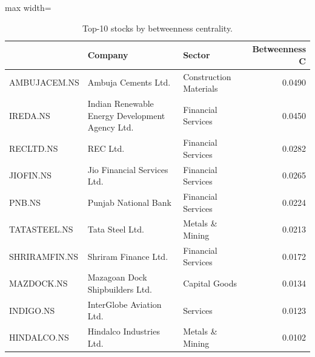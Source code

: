 \begin{table}
\centering
\caption{Top-10 stocks by betweenness centrality.}
\label{tab:top10_betweenness}
\begin{adjustbox}{max width=\textwidth}
\begin{tabular}{lllr}
\toprule
 & Company & Sector & Betweenness C \\
\midrule
AMBUJACEM.NS & Ambuja Cements Ltd. & Construction Materials & 0.0490 \\
IREDA.NS & Indian Renewable Energy Development Agency Ltd. & Financial Services & 0.0450 \\
RECLTD.NS & REC Ltd. & Financial Services & 0.0282 \\
JIOFIN.NS & Jio Financial Services Ltd. & Financial Services & 0.0265 \\
PNB.NS & Punjab National Bank & Financial Services & 0.0224 \\
TATASTEEL.NS & Tata Steel Ltd. & Metals \& Mining & 0.0213 \\
SHRIRAMFIN.NS & Shriram Finance Ltd. & Financial Services & 0.0172 \\
MAZDOCK.NS & Mazagoan Dock Shipbuilders Ltd. & Capital Goods & 0.0134 \\
INDIGO.NS & InterGlobe Aviation Ltd. & Services & 0.0123 \\
HINDALCO.NS & Hindalco Industries Ltd. & Metals \& Mining & 0.0102 \\
\bottomrule
\end{tabular}
\end{adjustbox}
\end{table}
